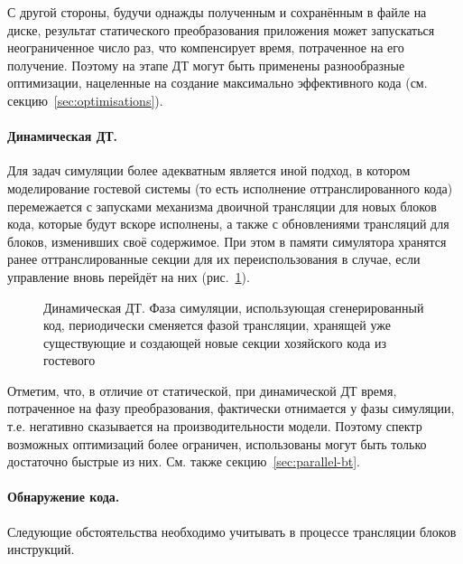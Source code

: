 С другой стороны, будучи однажды полученным и сохранённым в файле на диске, результат статического преобразования приложения может запускаться неограниченное число раз, что компенсирует время, потраченное на его получение. Поэтому на этапе ДТ могут быть применены разнообразные оптимизации, нацеленные на создание максимально эффективного кода (см. секцию~\ref{sec:optimisations}).

\paragraph{Динамическая ДТ.} Для задач симуляции более адекватным является иной подход, в котором моделирование гостевой системы (то есть исполнение оттранслированного кода) перемежается с запусками механизма двоичной трансляции для новых блоков кода, которые будут вскоре исполнены, а также с обновлениями трансляций для блоков, изменивших своё содержимое. При этом в памяти симулятора хранятся ранее оттранслированные секции для их переиспользования в случае, если управление вновь перейдёт на них (рис.~\ref{fig:dynamic-bt}).

\begin{figure}[htb]
    \centering
    \caption[Динамическая ДТ]{Динамическая ДТ. Фаза симуляции, использующая сгенерированный код, периодически сменяется фазой трансляции, хранящей уже существующие  и создающей новые секции хозяйского кода из гостевого}
    \label{fig:dynamic-bt}
\end{figure}

Отметим, что, в отличие от статической, при динамической ДТ время, потраченное на фазу преобразования, фактически отнимается у фазы симуляции, т.е. негативно сказывается на производительности модели. Поэтому спектр возможных оптимизаций более ограничен, использованы могут быть только достаточно быстрые из них. См. также секцию~\ref{sec:parallel-bt}.

\paragraph{Обнаружение кода.} Следующие обстоятельства необходимо учитывать в процессе трансляции блоков инструкций.


